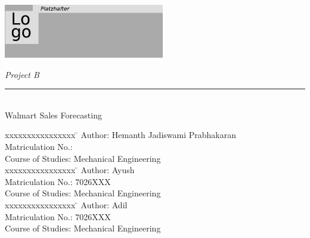 %
%
%



\begin{titlepage}
    
    \begin{flushleft} 
        \includegraphics[width=7cm]{General/Logo.png}
    \end{flushleft} 
    
    \begin{flushright}
        \vspace{3cm}
        \LARGE \textsl{Project B}\\
        \rule{0.6\textwidth}{0.4pt} ~\\
        \vspace{0.5cm}
        \textsf{\LARGE Walmart Sales Forecasting}\\
        \textsf{\LARGE }
    \end{flushright}
    
    \vspace{2cm}
    \large
    \begin{tabbing}
        xxxxxxxxxxxxxxxx \= \kill
        Author: \> Hemanth Jadiswami Prabhakaran \\
        Matriculation No.:  \\
        Course of Studies: \> Mechanical Engineering \\ [0.5cm]

        xxxxxxxxxxxxxxxx \= \kill
		Author: \> Ayush \\	
		Matriculation No.: \> 7026XXX \\
		Course of Studies: \> Mechanical Engineering \\ [0.5cm]
		
		xxxxxxxxxxxxxxxx \= \kill
		Author: \> Adil \\	
		Matriculation No.: \> 7026XXX \\
		Course of Studies: \> Mechanical Engineering \\ [0.5cm]


\end{tabbing}
\end{titlepage}
